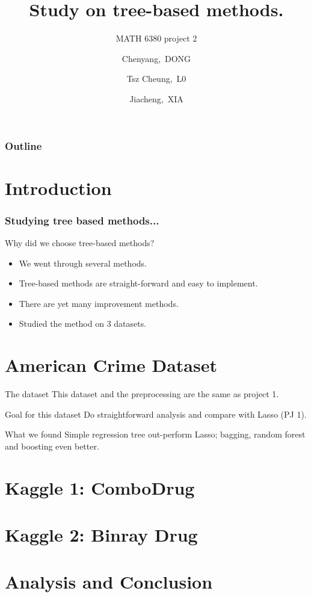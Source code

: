\documentclass{beamer}
\title[MATH 6380 Project 2]{Study on tree-based methods.}
\subtitle{MATH 6380 project 2}
\author[C.Dong, T.C.LO, J.Xia]
{Chenyang,~DONG \and Tsz Cheung,~L0 \and Jiacheng,~XIA}
\begin{document}
\frame{\titlepage}

\begin{frame}
\frametitle{Outline}
\tableofcontents
\end{frame}

\section{Introduction}
\begin{frame}
\frametitle{Studying tree based methods...}
Why did we choose tree-based methods?
\pause
\begin{itemize}
\item We went through several methods.
\pause
\item Tree-based methods are straight-forward and easy to implement.
\pause
\item There are yet many improvement methods.
\pause
\item Studied the method on 3 datasets.
\end{itemize}
\end{frame}

\section{American Crime Dataset}
\begin{frame}
\begin{block}{The dataset}
This dataset and the preprocessing are the same as project 1.
\end{block}
\pause
\begin{exampleblock}{Goal for this dataset}
Do straightforward analysis and compare with Lasso (PJ 1).
\end{exampleblock}
\begin{alertblock}{What we found}
Simple regression tree out-perform Lasso; bagging, random forest and boosting even better.
\end{alertblock}
\end{frame}

\section{Kaggle 1:  ComboDrug}

\section{Kaggle 2: Binray Drug}

\section{Analysis and Conclusion}
\end{document}
